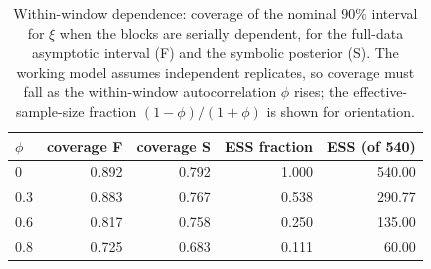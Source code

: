 \begin{table}[t]
\centering
\small
\caption{Within-window dependence: coverage of the nominal $90\%$ interval for $\xi$ when the blocks are serially dependent, for the full-data asymptotic interval (F) and the symbolic posterior (S). The working model assumes independent replicates, so coverage must fall as the within-window autocorrelation $\phi$ rises; the effective-sample-size fraction $(1-\phi)/(1+\phi)$ is shown for orientation.}
\label{tab:supp-ar1}
\begin{tabular}{lrrrr}
\toprule
$\phi$ & coverage F & coverage S & ESS fraction & ESS (of 540) \\
\midrule
0 & 0.892 & 0.792 & 1.000 & 540.00 \\
 0.3 & 0.883 & 0.767 & 0.538 & 290.77 \\
 0.6 & 0.817 & 0.758 & 0.250 & 135.00 \\
 0.8 & 0.725 & 0.683 & 0.111 & 60.00 \\
\bottomrule
\end{tabular}
\end{table}

